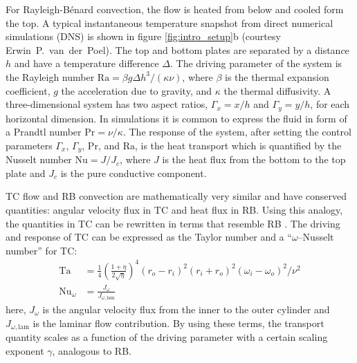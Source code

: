 For Rayleigh-B\'enard convection, the flow is heated from below and cooled
form the top\citep{Lohse2010}. A typical instantaneous temperature snapshot from direct
numerical simulations (DNS) is shown in figure \ref{fig:intro_setup}b
(courtesy Erwin~P.~van~der~Poel). The top and bottom plates are separated by a
distance $h$ and have a temperature difference $\Delta$. The driving parameter of
the system is the Rayleigh number $\text{Ra}=\beta g \Delta h^3 / (\kappa
\nu)$, where $\beta$ is the thermal expansion coefficient, $g$ the
acceleration due to gravity, and $\kappa$ the thermal diffusivity.  A
three-dimensional system has two aspect ratios, $\Gamma_x=x/h$ and
$\Gamma_y=y/h$, for each horizontal dimension. In simulations it is common to
express the fluid in form of a Prandtl number $\text{Pr}=\nu/\kappa$. The
response of the system, after setting the control parameters $\Gamma_x$,
$\Gamma_y$, $\text{Pr}$, and $\text{Ra}$, is the heat transport which is
quantified by the Nusselt number $\text{Nu}=J/J_c$, where $J$ is the heat
flux from the bottom to the top plate and $J_c$ is the pure conductive
component.

TC flow and RB convection are mathematically very similar \citep{Eckhardt2006}
and have conserved quantities: angular velocity flux in TC and heat flux in
RB. Using this analogy, the quantities in TC can be rewritten in terms that
resemble RB \citep{Eckhardt2007}. The driving and response of TC can be
expressed as the Taylor number and a ``$\omega$--Nusselt number'' for TC:
\begin{align}
\text{Ta}&=\frac{1}{4}\left(\frac{1+\eta}{2\sqrt{\eta}}\right)^4(r_o - r_i)^2
(r_i + r_o)^2(\omega_i - \omega_o)^2/\nu^2\\
\text{Nu}_\omega&=\frac{J_\omega}{J_{\omega,\text{lam}}}
\end{align}
here, $J_\omega$ is the angular velocity flux from the inner to the outer
cylinder and $J_{\omega,\text{lam}}$ is the laminar flow contribution. By
using these terms, the transport quantity scales as a function of the driving
parameter with a certain scaling exponent $\gamma$, analogous to RB.

